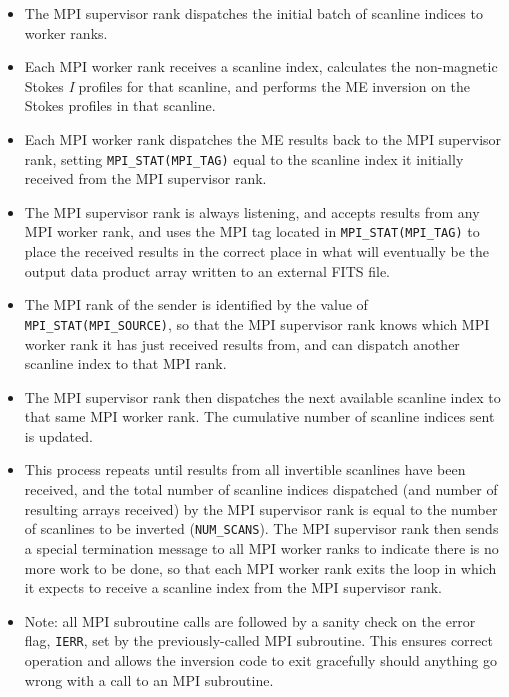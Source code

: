 \documentclass[11pt]{article}
\begin{document}
\begin{itemize}
  \renewcommand\labelitemi{\scriptsize$\blacksquare$}
  \item The MPI supervisor rank dispatches the initial batch of scanline indices to worker ranks.
  \item Each MPI worker rank receives a scanline index, calculates the non-magnetic Stokes
        \textit{I} profiles for that scanline, and performs the ME inversion on the Stokes profiles
        in that scanline.  
  \item Each MPI worker rank dispatches the ME results back to the MPI supervisor rank, setting
        \texttt{MPI\_STAT(MPI\_TAG)} equal to the scanline index it initially received from the
        MPI supervisor rank.
  \item The MPI supervisor rank is always listening, and accepts results from any MPI worker rank,
        and uses the MPI tag located in \texttt{MPI\_STAT(MPI\_TAG)} to place the received results
        in the correct place in what will eventually be the output data product array written to an
        external FITS file.
  \item The MPI rank of the sender is identified by the value of \texttt{MPI\_STAT(MPI\_SOURCE)},
        so that the MPI supervisor rank knows which MPI worker rank it has just received results from, 
        and can dispatch another scanline index to that MPI rank.
  \item The MPI supervisor rank then dispatches the next available scanline index to that same
        MPI worker rank.  The cumulative number of scanline indices sent  is updated.
  \item This process repeats until results from all invertible scanlines have been received, and
        the total number of scanline indices dispatched (and number of resulting arrays received)
        by the MPI supervisor rank is equal to the number of scanlines to be inverted (\texttt{NUM\_SCANS}).
        The MPI supervisor rank then sends a special termination message to all MPI worker ranks to
        indicate there is no more work to be done, so that each MPI worker rank exits the loop in
        which it expects to receive a scanline index from the MPI supervisor rank.
  \item Note: all MPI subroutine calls are followed by a sanity check on the error flag, \texttt{IERR},
        set by the previously-called MPI subroutine.  This ensures correct operation and allows
        the inversion code to exit gracefully should anything go wrong with a call to an MPI subroutine.
\end{itemize}
\end{document}
